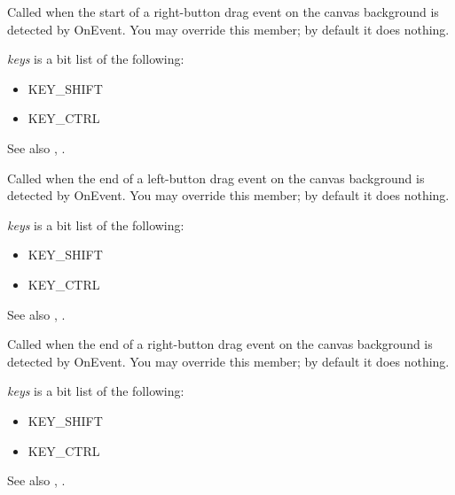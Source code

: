 Called when the start of a right-button drag event on the canvas background is detected by OnEvent. You may override this member;
by default it does nothing.

{\it keys} is a bit list of the following:

\begin{itemize}\itemsep=0pt
\item KEY\_SHIFT
\item KEY\_CTRL
\end{itemize}

See also , .

\label{onenddragleft}


Called when the end of a left-button drag event on the canvas background is detected by OnEvent. You may override this member;
by default it does nothing.

{\it keys} is a bit list of the following:

\begin{itemize}\itemsep=0pt
\item KEY\_SHIFT
\item KEY\_CTRL
\end{itemize}

See also , .

\label{onenddragright}


Called when the end of a right-button drag event on the canvas background is detected by OnEvent. You may override this member;
by default it does nothing.

{\it keys} is a bit list of the following:

\begin{itemize}\itemsep=0pt
\item KEY\_SHIFT
\item KEY\_CTRL
\end{itemize}

See also , .

\label{ondragleft}

